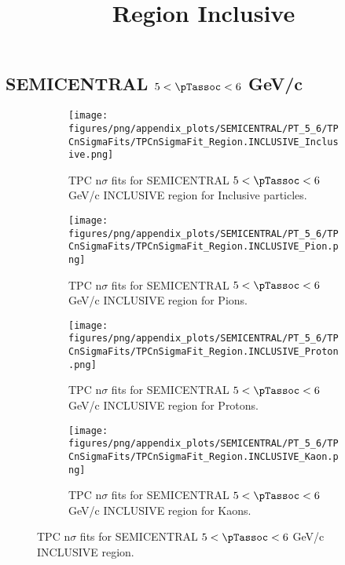     
            \subsection*{SEMICENTRAL $5 < \pTassoc < 6$ GeV/c}
            \begin{figure}[H]
                \title{Region Inclusive}
                \begin{subfigure}[b]{0.5\textwidth}
                    \centering
                    \texttt{[image: figures/png/appendix\_plots/SEMICENTRAL/PT\_5\_6/TPCnSigmaFits/TPCnSigmaFit\_Region.INCLUSIVE\_Inclusive.png]}
                    \caption{TPC n$\sigma$ fits for SEMICENTRAL $5 < \pTassoc < 6$ GeV/c INCLUSIVE region for Inclusive particles.}
                    \label{fig:appendix_SEMICENTRAL_$5 < \pTassoc < 6$ GeV/c_INCLUSIVE_Inclusive}
                \end{subfigure}
                \begin{subfigure}[b]{0.5\textwidth}
                    \centering
                    \texttt{[image: figures/png/appendix\_plots/SEMICENTRAL/PT\_5\_6/TPCnSigmaFits/TPCnSigmaFit\_Region.INCLUSIVE\_Pion.png]}
                    \caption{TPC n$\sigma$ fits for SEMICENTRAL $5 < \pTassoc < 6$ GeV/c INCLUSIVE region for Pions.}
                    \label{fig:appendix_SEMICENTRAL_$5 < \pTassoc < 6$ GeV/c_INCLUSIVE_Pion}
                \end{subfigure}
                \begin{subfigure}[b]{0.5\textwidth}
                    \centering
                    \texttt{[image: figures/png/appendix\_plots/SEMICENTRAL/PT\_5\_6/TPCnSigmaFits/TPCnSigmaFit\_Region.INCLUSIVE\_Proton.png]}
                    \caption{TPC n$\sigma$ fits for SEMICENTRAL $5 < \pTassoc < 6$ GeV/c INCLUSIVE region for Protons.}
                    \label{fig:appendix_SEMICENTRAL_$5 < \pTassoc < 6$ GeV/c_INCLUSIVE_Proton}
                \end{subfigure}
                \begin{subfigure}[b]{0.5\textwidth}
                    \centering
                    \texttt{[image: figures/png/appendix\_plots/SEMICENTRAL/PT\_5\_6/TPCnSigmaFits/TPCnSigmaFit\_Region.INCLUSIVE\_Kaon.png]}
                    \caption{TPC n$\sigma$ fits for SEMICENTRAL $5 < \pTassoc < 6$ GeV/c INCLUSIVE region for Kaons.}
                    \label{fig:appendix_SEMICENTRAL_$5 < \pTassoc < 6$ GeV/c_INCLUSIVE_Kaon}
                \end{subfigure}
                \caption{TPC n$\sigma$ fits for SEMICENTRAL $5 < \pTassoc < 6$ GeV/c INCLUSIVE region.}
                \label{fig:appendix_SEMICENTRAL_$5 < \pTassoc < 6$ GeV/c_INCLUSIVE}
            \end{figure}

